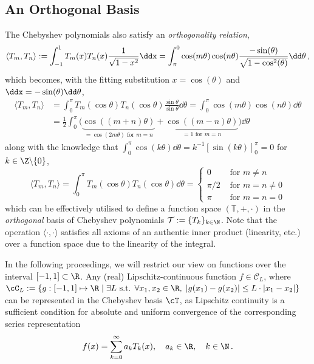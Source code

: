 \documentclass[12pt, a4paper]{article}
\newcommand{\chebyshev}{Chebyshev\xspace}
\begin{document}
  \subsection{An Orthogonal Basis}
  The \chebyshev polynomials also satisfy an \emph{orthogonality relation},
  $$\langle T_m, T_n \rangle := \int_{-1}^1 T_m(x) T_n(x) \frac{1}{\sqrt{1-x^2}} \ddx = \int_{\pi}^{0} \cos(m \theta) \cos(n \theta) \frac{-\sin(\theta)}{\sqrt{1-\cos^2(\theta)}} \dd\theta \,,$$
  which becomes, with the fitting substitution $x = \cos(\theta)$ and $\ddx = -\sin(\theta) \dd\theta$,
  \begin{align*}
    \langle T_m, T_n \rangle & = \int_0^\pi T_m(\cos \theta) T_n(\cos \theta) \frac{\sin \theta}{\sin \theta}\dd\theta = \int_0^\pi \cos(m \theta) \cos(n \theta) \dd\theta                            \\
                             & = \frac{1}{2} \int_0^\pi \big(\underbrace{\cos((m+n) \theta)}_{=\cos(2m\theta) \text{ for } m=n} + \underbrace{\cos((m-n) \theta)}_{=1 \text{ for } m=n}\big) \dd\theta
  \end{align*}
  along with the knowledge that $\int_0^\pi \cos(k \theta) \dd\theta = k^{-1} \left[\sin(k\theta)\right]_0^\pi = 0$ for $k \in \Z \backslash \{0\}$,
  $$\langle T_m, T_n \rangle = \int_0^\pi T_m(\cos \theta) T_n(\cos \theta) \dd\theta = \begin{cases}
      0     & \text{ for } m \neq n     \\
      \pi/2 & \text{ for } m = n \neq 0 \\
      \pi   & \text{ for } m = n = 0
    \end{cases}$$
  which can be effectively utilised to define a function space $(\mathbb{T}, +, \cdot)$ in the \emph{orthogonal} basis of \chebyshev polynomials $\mathcal{T} := \{T_k\}_{k \in \N}$.
  Note that the operation $\langle \cdot, \cdot \rangle$ satisfies all axioms of an authentic inner product (linearity, etc.) over a function space due to the linearity of the integral.

  In the following proceedings, we will restrict our view on functions over the interval $[-1, 1] \subset \R$.
  Any (real) Lipschitz-continuous function $f \in \mathcal{C}_L$, where $\cC_L := \{g: [-1, 1] \mapsto \R \;|\; \exists L \text{ s.t. } \forall x_1, x_2 \in \R, \; |g(x_1) - g(x_2)| \le L \cdot |x_1-x_2|\}$ can be represented in the \chebyshev basis $\cT$, as Lipschitz continuity is a sufficient condition for absolute and uniform convergence of the corresponding series representation \parencite{atap}
  $$f(x) = \sum_{k=0}^\infty a_k T_k(x), \quad a_k \in \R,\quad k \in \N \,.$$
\end{document}
